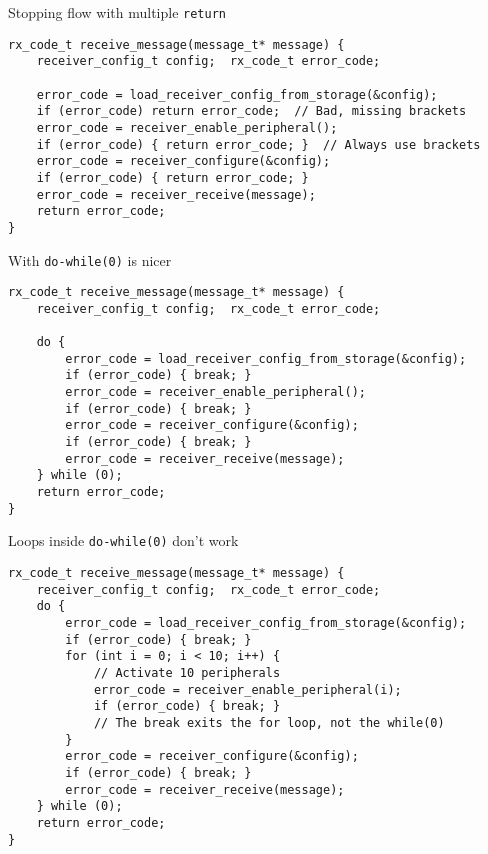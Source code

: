\documentclass[aspectratio=169,14pt]{beamer}
\begin{document}
\begin{frame}[fragile]{Stopping flow with multiple \texttt{return}}
\begin{lstlisting}[style=cstyle]
rx_code_t receive_message(message_t* message) {
    receiver_config_t config;  rx_code_t error_code;
    
    error_code = load_receiver_config_from_storage(&config);
    if (error_code) return error_code;  // Bad, missing brackets
    error_code = receiver_enable_peripheral();
    if (error_code) { return error_code; }  // Always use brackets
    error_code = receiver_configure(&config);
    if (error_code) { return error_code; }
    error_code = receiver_receive(message);
    return error_code;
}
\end{lstlisting}
\end{frame}



\begin{frame}[fragile]{With \texttt{do-while(0)} is nicer}
\begin{lstlisting}[style=cstyle]
rx_code_t receive_message(message_t* message) {
    receiver_config_t config;  rx_code_t error_code;
    
    do {
        error_code = load_receiver_config_from_storage(&config);
        if (error_code) { break; }
        error_code = receiver_enable_peripheral();
        if (error_code) { break; }
        error_code = receiver_configure(&config);
        if (error_code) { break; }
        error_code = receiver_receive(message);
    } while (0);
    return error_code;
}
\end{lstlisting}
\end{frame}



\begin{frame}[fragile]{Loops inside \texttt{do-while(0)} don't work}
\begin{lstlisting}[style=cstyle]
rx_code_t receive_message(message_t* message) {
    receiver_config_t config;  rx_code_t error_code;
    do {
        error_code = load_receiver_config_from_storage(&config);
        if (error_code) { break; }
        for (int i = 0; i < 10; i++) {
            // Activate 10 peripherals
            error_code = receiver_enable_peripheral(i);
            if (error_code) { break; }
            // The break exits the for loop, not the while(0)
        }
        error_code = receiver_configure(&config);
        if (error_code) { break; }
        error_code = receiver_receive(message);
    } while (0);
    return error_code;
}
\end{lstlisting}
\end{frame}
\end{document}
